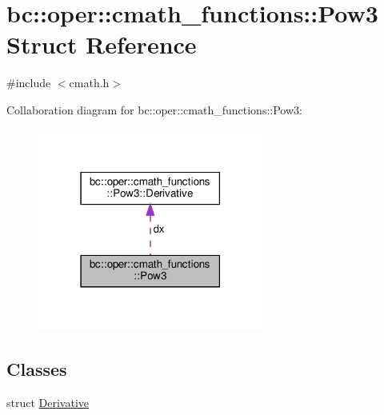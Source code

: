 \hypertarget{structbc_1_1oper_1_1cmath__functions_1_1Pow3}{}\section{bc\+:\+:oper\+:\+:cmath\+\_\+functions\+:\+:Pow3 Struct Reference}
\label{structbc_1_1oper_1_1cmath__functions_1_1Pow3}


{\ttfamily \#include $<$cmath.\+h$>$}



Collaboration diagram for bc\+:\+:oper\+:\+:cmath\+\_\+functions\+:\+:Pow3\+:\nopagebreak
\begin{figure}[H]
\begin{center}
\leavevmode
\includegraphics[width=210pt]{structbc_1_1oper_1_1cmath__functions_1_1Pow3__coll__graph}
\end{center}
\end{figure}
\subsection*{Classes}
\begin{DoxyCompactItemize}
\item 
struct \hyperlink{structbc_1_1oper_1_1cmath__functions_1_1Pow3_1_1Derivative}{Derivative}
\end{DoxyCompactItemize}
